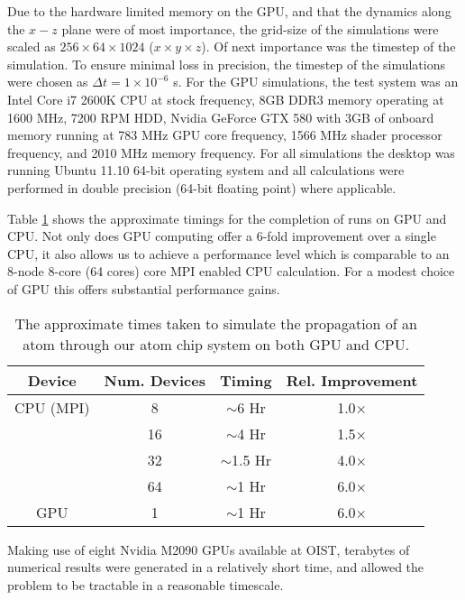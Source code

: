 Due to the hardware limited memory on the GPU, and that the dynamics along the $x-z$ plane were of most importance, the grid-size of the simulations were scaled as $256\times 64\times1024$ ($x\times y\times z$). Of next importance was the timestep of the simulation.  To ensure minimal loss in precision, the timestep of the simulations were chosen as $\Delta t = 1\times 10^{-6}$ s. For the GPU simulations, the test system was an Intel Core i7 2600K CPU at stock frequency, 8GB DDR3 memory operating at 1600 MHz, 7200 RPM HDD, Nvidia GeForce GTX 580 with 3GB of onboard memory running at 783 MHz GPU core frequency, 1566 MHz shader processor frequency, and 2010 MHz memory frequency. For all simulations the desktop was running Ubuntu 11.10 64-bit operating system and all calculations were performed in double precision (64-bit floating point) where applicable.

Table \ref{tbl:timing} shows the approximate timings for the completion of runs on GPU and CPU. Not only does GPU computing offer a 6-fold improvement over a single CPU, it also allows us to achieve a performance level which is comparable to an 8-node 8-core (64 cores) core MPI enabled CPU calculation. For a modest choice of GPU this offers substantial performance gains.

\begin{table}[tb]
  \begin{center}
    \begin{tabular}{|c||c|c|c|}
      \hline
      Device & Num. Devices & Timing  & Rel. Improvement \\ \hline
      CPU (MPI) & 8 & $\sim$6 Hr & 1.0$\times$ \\
      & 16 & $\sim$4 Hr & 1.5$\times$ \\
      & 32 & $\sim$1.5 Hr & 4.0$\times$ \\
      & 64 & $\sim$1 Hr & 6.0$\times$ \\ \hline
      GPU & 1 & $\sim$1 Hr & 6.0$\times$ \\ \hline
    \end{tabular}
  \end{center}
   \caption{The approximate times taken to simulate the propagation of an atom through our atom chip system on both GPU and CPU.}
   \label{tbl:timing}
\end{table}

Making use of eight Nvidia M2090 GPUs available at OIST, terabytes of numerical results were generated in a relatively short time, and allowed the problem to be tractable in a reasonable timescale.
